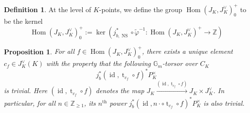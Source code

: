\documentclass[11pt,oneside]{amsart}
\theoremstyle{plain}
\newtheorem{proposition}[theorem]{Proposition}
\theoremstyle{definition}
\newtheorem{definition}[theorem]{Definition}
\def\G{{\bf G}}
\DeclareMathOperator{\NS}{NS}
\DeclareMathOperator{\id}{id} \DeclareMathOperator{\Sel}{Sel}
\DeclareMathOperator{\Hom}{Hom}
\DeclareMathOperator{\tr}{t}
\def\Z{\mathbb{Z}}
\def\C{\mathbb{C}}
\def\G{\mathbb{G}}
\def\ra{\rightarrow}
\begin{document}
\begin{definition} 
At the level of $K$-points, we define the group $\Hom(J_K, J_K^\vee)_0^+$ to be the kernel 
$$
\Hom(J_K, J_K^\vee)_0^+ := \ker \left( j_{b, \NS}^*\circ \tilde{\varphi}^{-1}: \Hom(J_K, J_K^\vee)^+ \ra \Z \right) 
$$ %
\end{definition}

\begin{proposition}\label{prop:trivtorsor}
For all $f\in \Hom(J_K, J_K^\vee)_0^+$, there exists a unique element $c_f\in J_K^\vee(K)$ with the property that the following $\G_m$-torsor over $C_K$
$$
j_b^*(\id, \tr_{c_f}\circ f)^* P_K^\times
$$ 
is trivial. Here $(\id, \tr_{c_f} \circ f)$ denotes the map $J_K \xrightarrow{(\id, \tr_{c_f} \circ f)} J_K \times J_K^\vee$. 
In particular, for all $n\in\Z_{\ge 1}$, its $n^\text{th}$ power $j_b^*(\id, n\cdot \circ \tr_{c_f}\circ f)^* P_K^\times$ is also trivial. 
\end{proposition}
\end{document}
